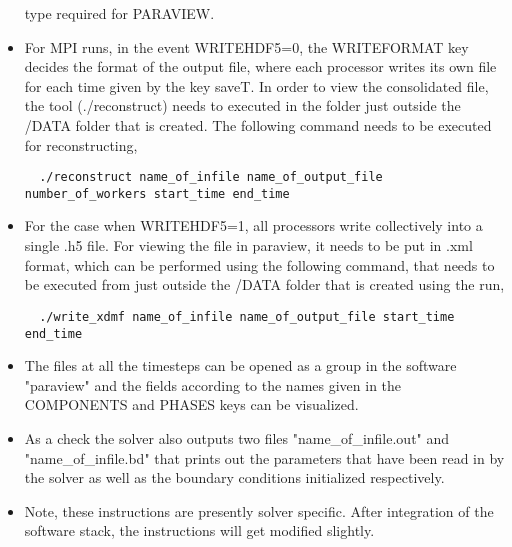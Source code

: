 \documentclass[a4paper,10pt]{article}
\begin{document}
\begin{itemize}
 type required for PARAVIEW.
 \item For MPI runs, in the event WRITEHDF5=0, the WRITEFORMAT key decides the format of the output file, where 
 each processor writes its own file for each time given by the key saveT. In order to view the consolidated file, 
 the tool (./reconstruct) needs to executed in the folder just outside the /DATA folder that is created. The following 
 command needs to be executed for reconstructing,
 \begin{lstlisting}
  ./reconstruct name_of_infile name_of_output_file number_of_workers start_time end_time 
 \end{lstlisting}
 \item For the case when WRITEHDF5=1, all processors write collectively into a single .h5 file. For viewing the file in 
 paraview, it needs to be put in .xml format, which can be performed using the following command, that needs to be
 executed from just outside the /DATA folder that is created using the run,
 \begin{lstlisting}
  ./write_xdmf name_of_infile name_of_output_file start_time end_time
 \end{lstlisting}
 \item The files at all the timesteps can be opened as a group in the software "paraview" and the fields according to the names given in the COMPONENTS and PHASES keys can be visualized.
 \item As a check the solver also outputs two files "name\_of\_infile.out" and "name\_of\_infile.bd" that prints out the parameters that have been read in by the solver as well as the 
 boundary conditions initialized respectively.
 \item Note, these instructions are presently solver specific. After integration of the software stack, 
 the instructions will get modified slightly.
\end{itemize}
\end{document}
